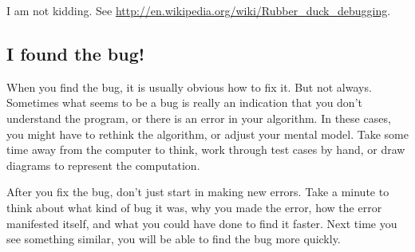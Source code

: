 \documentclass[12pt]{book}
\theoremstyle{definition}
\begin{document}
I am not kidding.  See
\url{http://en.wikipedia.org/wiki/Rubber_duck_debugging}.


\subsection*{I found the bug!}

When you find the bug, it is usually obvious how to fix it.  But not
always.  Sometimes what seems to be a bug is really an indication that
you don't understand the program, or there is an error in your
algorithm.  In these cases, you might have to rethink the algorithm,
or adjust your mental model.  Take some time away from
the computer to think, work through test cases
by hand, or draw diagrams to represent the computation.

After you fix the bug, don't just start in making new errors.
Take a minute to think about what kind of bug it was, why you made
the error, how the error manifested itself, and
what you could have done to find it faster.  Next time you see something
similar, you will be able to find the bug more quickly.


\printindex

\clearemptydoublepage
\end{document}
